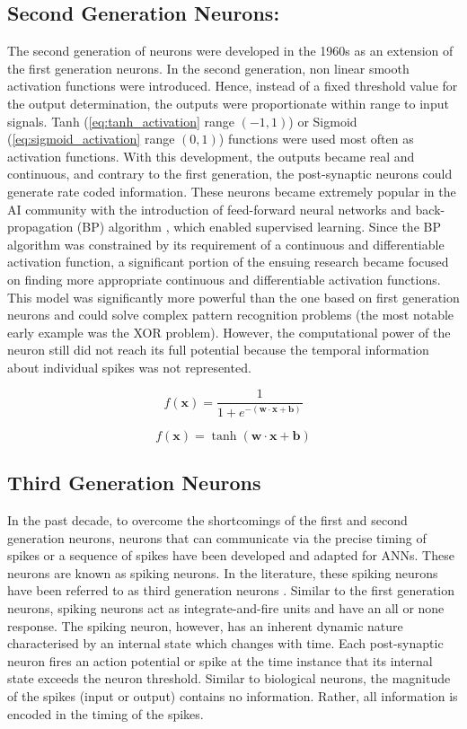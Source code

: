 \subsection{Second Generation Neurons:}
The second generation of neurons were developed in the 1960s as an extension of the first generation neurons. In the second generation, non linear smooth activation functions were introduced. Hence, instead of a fixed threshold value for the output determination, the outputs were proportionate within range to input signals. Tanh (\equationname \ref{eq:tanh_activation} range $(-1, 1)$) or Sigmoid (\equationname \ref{eq:sigmoid_activation} range $(0, 1)$) functions were used most often as activation functions. With this development, the outputs became real and continuous, and contrary to the first generation, the post-synaptic neurons could generate rate coded information. These neurons became extremely popular in the AI community with the introduction of feed-forward neural networks and back-propagation (BP) algorithm \citep{rumelhart1988learning}, which enabled supervised learning. Since the BP algorithm was constrained by its requirement of a continuous and differentiable activation function, a significant portion of the ensuing research became focused on finding more appropriate continuous and differentiable activation functions. This model was significantly more powerful than the one based on first generation neurons and could solve complex pattern recognition problems (the most notable early example was the XOR problem). However, the computational power of the neuron still did not reach its full potential because the temporal information about individual spikes was not represented.

\begin{equation}
f(\mathbf{x})=\frac{1}{1+e^{-(\mathbf{w\cdot x+b})}}
\label{eq:sigmoid_activation}
\end{equation}

\begin{equation}
f(\mathbf{x})=\tanh(\mathbf{w\cdot x+b})
\label{eq:tanh_activation}
\end{equation}
\subsection{Third Generation Neurons}

In the past decade, to overcome the shortcomings of the first and second generation neurons, neurons that can communicate via the precise timing of spikes or a sequence of spikes have been developed and adapted for ANNs. These neurons are known as spiking neurons. In the literature, these spiking neurons have been referred to as third generation neurons \citep{maass2001pulsed}. Similar to the first generation neurons, spiking neurons act as integrate-and-fire units and have an all or none response. The spiking neuron, however, has an inherent dynamic nature characterised by an internal state which changes with time. Each post-synaptic neuron fires an action potential or spike at the time instance that its internal state exceeds the neuron threshold. Similar to biological neurons, the magnitude of the spikes (input or output) contains no information. Rather, all information is encoded in the timing of the spikes. 

